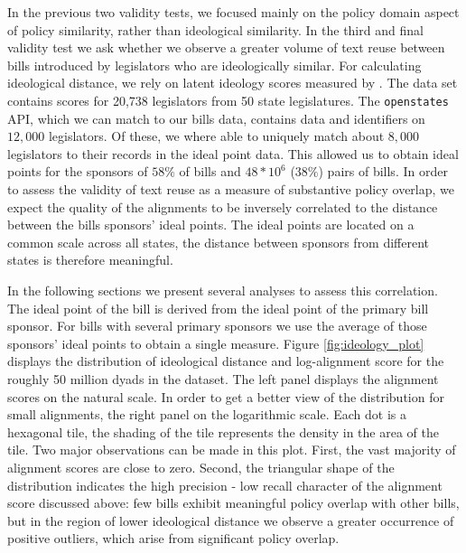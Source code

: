 \documentclass[12pt]{article} %
\begin{document}
In the previous two validity tests, we focused mainly on the policy domain
aspect of policy similarity, rather than ideological similarity. In the third
and final validity test we ask whether we observe a greater volume of text reuse
between bills introduced by legislators who are ideologically similar. For
calculating ideological distance, we rely on latent ideology scores measured by
\citep{shor2011}. The data set contains scores for 20,738 legislators from 50
state legislatures. The \texttt{openstates} API, which we can match to our bills
data, contains data and identifiers on $12,000$ legislators. Of these, we where
able to uniquely match about $8,000$ legislators to their records in the ideal
point data. This allowed us to obtain ideal points for the sponsors of $58\%$ of
bills and $48*10^6$ ($38\%$) pairs of bills. In order to assess the validity of text reuse as a measure of substantive policy overlap, we expect the quality of the alignments to be inversely correlated to the distance between the bills sponsors' ideal points. The ideal points are located on a common scale across all states, the distance between sponsors from different states is therefore meaningful. 

In the following sections we present several analyses to assess this correlation. The ideal point of the bill is derived from the ideal point of the primary bill sponsor. For bills with several primary sponsors we use the average of those sponsors' ideal points to obtain a single measure. Figure \ref{fig:ideology_plot} displays the distribution of ideological distance and log-alignment score for the roughly 50 million dyads in the dataset. The left panel displays the alignment scores on the natural scale. In order to get a better view of the distribution for small alignments, the right panel on the logarithmic scale. Each dot is a hexagonal tile, the shading of the tile represents the density in the area of the tile. Two major observations can be made in this plot. First, the vast majority of alignment scores are close to zero. Second, the triangular shape of the distribution indicates the high precision - low recall character of the alignment score discussed above: few bills exhibit meaningful policy overlap with other bills, but in the region of lower ideological distance we observe a greater occurrence of positive outliers, which arise from significant policy overlap. 
\end{document}

